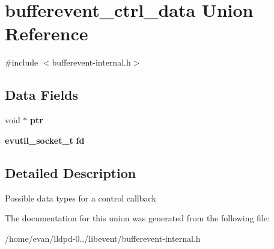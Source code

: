 \section{bufferevent\-\_\-ctrl\-\_\-data \-Union \-Reference}
\label{unionbufferevent__ctrl__data}


{\ttfamily \#include $<$bufferevent-\/internal.\-h$>$}

\subsection*{\-Data \-Fields}
\begin{DoxyCompactItemize}
\item 
void $\ast$ {\bfseries ptr}\label{unionbufferevent__ctrl__data_add9af9569af79ec26dd741fb226b38ba}

\item 
{\bf evutil\-\_\-socket\-\_\-t} {\bfseries fd}\label{unionbufferevent__ctrl__data_adf76ebacdedde5572e9ba938beab2afe}

\end{DoxyCompactItemize}


\subsection{\-Detailed \-Description}
\-Possible data types for a control callback 

\-The documentation for this union was generated from the following file\-:\begin{DoxyCompactItemize}
\item 
/home/evan/lldpd-\/0../libevent/bufferevent-\/internal.\-h\end{DoxyCompactItemize}
